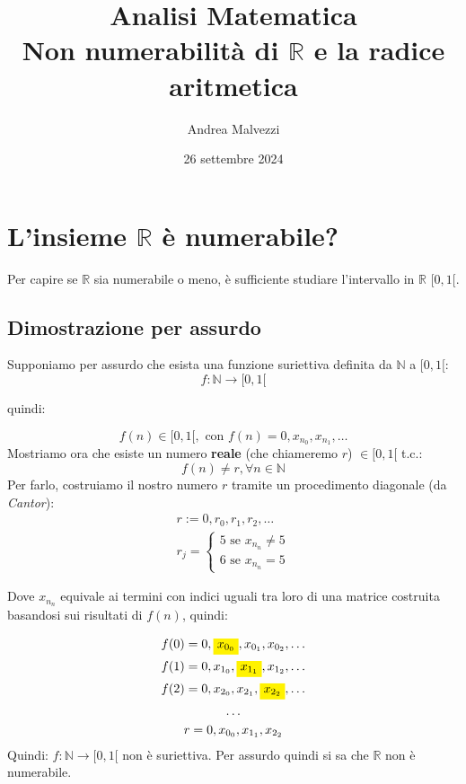 \documentclass[12pt]{article}
\title{\textbf{Analisi Matematica\\Non numerabilità di $\mathbb{R}$ e la radice aritmetica}}
\date{26 settembre 2024}
\author{Andrea Malvezzi}
\begin{document}
\maketitle
\pagebreak
\tableofcontents
\pagebreak
\section{L'insieme $\mathbb{R}$ è numerabile?}
Per capire se $\mathbb{R}$ sia numerabile o meno, è sufficiente studiare l'intervallo in $\mathbb{R}$ $[0,1[$.
\subsection{Dimostrazione per assurdo} \label{dim:non_numerabilità_R}
Supponiamo per assurdo che esista una funzione suriettiva definita da $\mathbb{N}$ a $[0,1[$:
\[f: \mathbb{N} \rightarrow [0,1[\]
\begin{center}
    quindi:
\end{center}
\[f(n) \in [0,1[, \text{ con } f(n) = 0, x_{n_0}, x_{n_1}, \dots\]
Mostriamo ora che esiste un numero \textbf{reale} (che chiameremo $r$) $\in [0,1[$ t.c.:
\[f(n) \not= r, \forall n \in \mathbb{N}\]
Per farlo, costruiamo il nostro numero $r$ tramite un procedimento diagonale (da \textit{Cantor}):
\begin{gather*}
    r := 0, r_0, r_1, r_2, \dots \\
    r_j = \begin{cases}
        5 \text{ se } x_{n_n} \not= 5\\
        6 \text{ se } x_{n_n} = 5
    \end{cases}
\end{gather*}
\begin{center}
    Dove $x_{n_n}$ equivale ai termini con indici uguali tra loro di una matrice costruita basandosi sui risultati di $f(n)$, quindi:
\end{center}
\begin{gather*}
    f(0) = 0, \colorbox{yellow}{$x_{0_0}$}, x_{0_1}, x_{0_2}, \dots \\
    f(1) = 0, x_{1_0}, \colorbox{yellow}{$x_{1_1}$}, x_{1_2}, \dots \\
    f(2) = 0, x_{2_0}, x_{2_1}, \colorbox{yellow}{$x_{2_2}$}, \dots \\
    \dots\\
    r = 0, x_{0_0}, x_{1_1}, x_{2_2}
\end{gather*}
Quindi: $f: \mathbb{N} \rightarrow [0,1[$ non è suriettiva. Per assurdo quindi si sa che $\mathbb{R}$ non è numerabile.
\pagebreak
\end{document}
